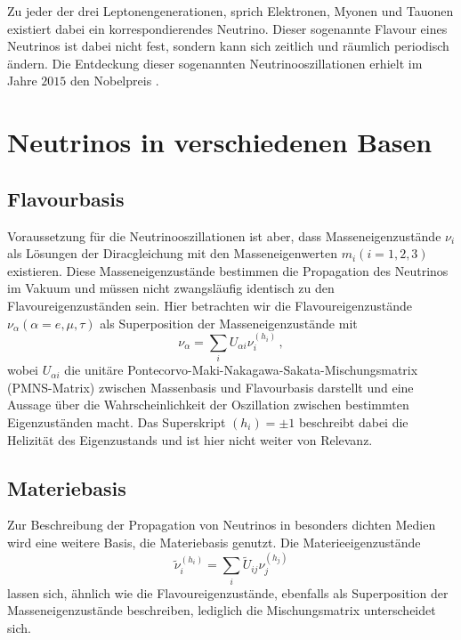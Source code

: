 Zu jeder der drei Leptonengenerationen, sprich Elektronen, Myonen und Tauonen existiert dabei ein korrespondierendes Neutrino.
Dieser sogenannte Flavour eines Neutrinos ist dabei nicht fest, sondern kann sich zeitlich und räumlich periodisch ändern.
Die Entdeckung dieser sogenannten Neutrinooszillationen erhielt im Jahre $2015$ den Nobelpreis \cite[S. ~19]{oberauer}.


\section{Neutrinos in verschiedenen Basen}
\label{sec:neutrinobasen}

\subsection{Flavourbasis} %
\label{subsec:flavourbasis}
Voraussetzung für die Neutrinooszillationen ist aber, dass Masseneigenzustände $\nu_i$ als Lösungen der Diracgleichung mit den Masseneigenwerten $m_i (i = 1, 2, 3)$ existieren.
Diese Masseneigenzustände bestimmen die Propagation des Neutrinos im Vakuum und müssen nicht zwangsläufig identisch zu den Flavoureigenzuständen sein.
Hier betrachten wir die Flavoureigenzustände $\nu_\alpha (\alpha = e, \mu, \tau)$ als Superposition der Masseneigenzustände mit
\begin{equation}
    \nu_\alpha = \sum_i U_{\alpha i} \nu^{(h_i)}_i \,,
    \label{eq:flavourbasis}
\end{equation}
wobei $U_{\alpha i}$ die unitäre Pontecorvo-Maki-Nakagawa-Sakata-Mischungsmatrix (PMNS-Matrix) zwischen Massenbasis und Flavourbasis darstellt und eine Aussage über die Wahrscheinlichkeit der Oszillation zwischen bestimmten Eigenzuständen macht.
Das Superskript $(h_i) = \pm 1$ beschreibt dabei die Helizität des Eigenzustands und ist hier nicht weiter von Relevanz.


\subsection{Materiebasis} %
\label{subsec:materiebasis}

Zur Beschreibung der Propagation von Neutrinos in besonders dichten Medien wird eine weitere Basis, die Materiebasis genutzt.
Die Materieeigenzustände
\begin{equation}
    \tilde{\nu}^{(h_i)}_i = \sum_i \tilde{U}_{i j} \nu^{(h_j)}_j
    \label{eq:materiebasis}
\end{equation} lassen sich, ähnlich wie die Flavoureigenzustände, ebenfalls als Superposition der Masseneigenzustände beschreiben, lediglich die Mischungsmatrix unterscheidet sich.


